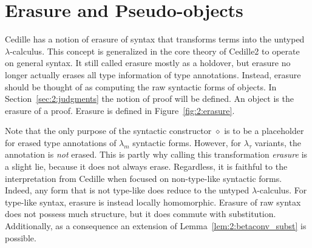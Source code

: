 \section{Erasure and Pseudo-objects}
\label{sec:2:erasure}

Cedille has a notion of erasure of syntax that transforms terms into the untyped $\lambda$-calculus.
This concept is generalized in the core theory of Cedille2 to operate on general syntax.
It still called erasure mostly as a holdover, but erasure no longer actually erases all type information of type annotations.
Instead, erasure should be thought of as computing the raw syntactic forms of objects.
In Section~\ref{sec:2:judgments} the notion of proof will be defined.
An object is the erasure of a proof.
Erasure is defined in Figure~\ref{fig:2:erasure}.



Note that the only purpose of the syntactic constructor $\diamond$ is to be a placeholder for erased type annotations of $\lambda_m$ syntactic forms.
However, for $\lambda_\tau$ variants, the annotation is \textit{not} erased.
This is partly why calling this transformation \textit{erasure} is a slight lie, because it does not always erase.
Regardless, it is faithful to the interpretation from Cedille when focused on non-type-like syntactic forms.
Indeed, any form that is not type-like does reduce to the untyped $\lambda$-calculus.
For type-like syntax, erasure is instead locally homomorphic.
Erasure of raw syntax does not possess much structure, but it does commute with substitution.
Additionally, as a consequence an extension of Lemma~\ref{lem:2:betaconv_subst} is possible.

